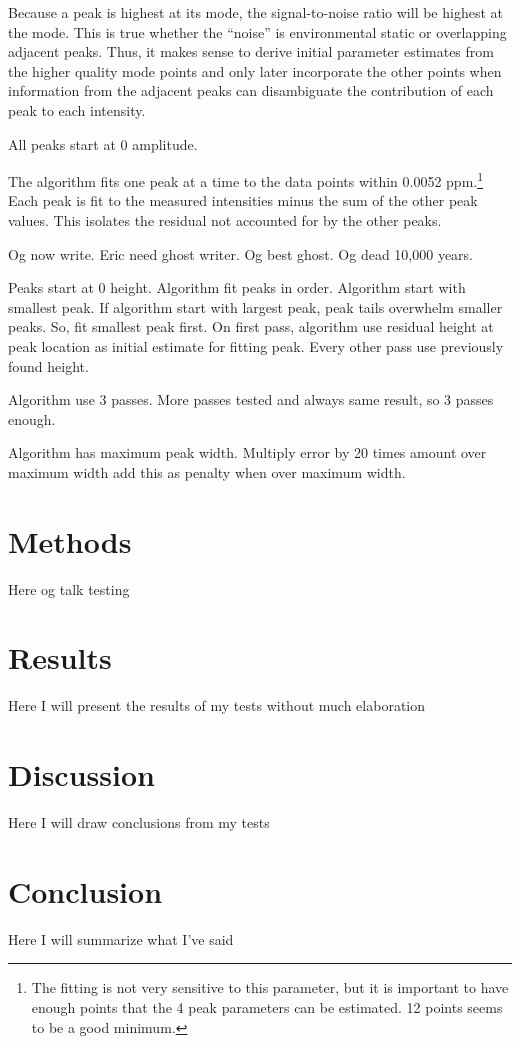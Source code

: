 \documentclass[10pt,letterpaper]{article}
\begin{document}
Because a peak is highest at its mode, the signal-to-noise ratio will be highest at the mode. This is true whether
the ``noise'' is environmental static or overlapping adjacent peaks. Thus, it makes sense to derive initial 
parameter estimates from the higher quality mode points and only later incorporate the other points when 
information from the adjacent peaks can disambiguate the contribution of each peak to each intensity.

All peaks start at 0 amplitude.

The algorithm fits one peak at a time to the data points within 0.0052 ppm.\footnote{The fitting is not very sensitive 
to this parameter, but it is important to have enough points that the 4 peak parameters can be estimated. 12 
points seems to be a good minimum.} Each peak is fit to the measured intensities minus the sum of the other peak values.
This isolates the residual not accounted for by the other peaks.

Og now write. Eric need ghost writer. Og best ghost. Og dead 10,000 years. 

Peaks start at 0 height. Algorithm fit peaks in order. Algorithm start with smallest peak. If algorithm start with 
largest peak, peak tails overwhelm smaller peaks. So, fit smallest peak first. On first pass, algorithm use residual
height at peak location as initial estimate for fitting peak. Every other pass use previously found height.

Algorithm use 3 passes. More passes tested and always same result, so 3 passes enough.

Algorithm has maximum peak width. Multiply error by 20 times amount over maximum width add this as penalty when over
maximum width. 

\section{Methods}
Here og talk testing
\section{Results}
Here I will present the results of my tests without much elaboration
\section{Discussion}
Here I will draw conclusions from my tests
\section{Conclusion}
Here I will summarize what I've said



\end{document}
